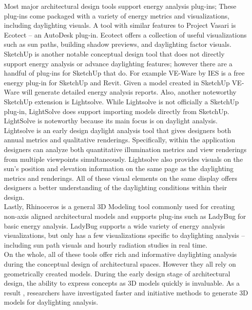 	Most major architectural design tools support energy analysis plug-ins; These plug-ins come packaged with a variety of energy metrics and visualizations, including daylighting visuals.
	A tool with similar features to Project Vasari is Ecotect -- an AutoDesk plug-in\cite{ecotect}.
	Ecotect offers a collection of useful visualizations such as sun paths, building shadow previews, and daylighting factor visuals. \\

	SketchUp is another notable conceptual design tool that does not directly support energy analysis or advance daylighting features\cite{sketchup}; however there are a handful of plug-ins for SketchUp that do.
	For example VE-Ware by IES is a free energy plug-in for SketchUp and Revit\cite{todo}. 
	Given a model created in SketchUp VE-Ware will generate detailed energy analysis reports.
	Also, another noteworthy SketchUp extension is Lightsolve\cite{andersen2008intuitive}.
	While Lightsolve is not officially a SketchUp plug-in, LightSolve does support importing models directly from SketchUp.
	LightSolve is noteworthy because its main focus is on daylight analysis.
	Lightsolve is an early design daylight analysis tool that gives designers both annual metrics and qualitative renderings.
	Specifically, within the application designers can analyze both quantitative illumination metrics and view renderings from multiple viewpoints simultaneously.
	Lightsolve also provides visuals on the sun's position and elevation information on the same page as the daylighting metrics and renderings. 
	All of these visual elements on the same display offers designers a better understanding of the daylighting conditions within their design\cite{andersen2011informing}. \\

	Lastly, Rhinoceros is a general 3D Modeling tool commonly used for creating non-axis aligned architectural models and supports plug-ins such as LadyBug for basic energy analysis\cite{todo,ladybug}.
	LadyBug supports a wide variety of energy analysis visualizations, but only has a few visualizations specific to daylighting analysis -- including sun path visuals and hourly radiation studies in real time. \\

	On the whole, all of these tools offer rich and informative daylighting analysis during the conceptual  design of architectural spaces.
	However they all rely on geometrically created models.
	During the early design stage of architectural design, the ability to express concepts as 3D models quickly is invaluable.
	As a result , researchers have investigated faster and initiative methods to generate 3D models for daylighting analysis.
	
